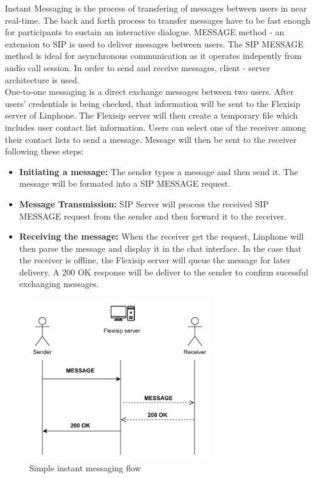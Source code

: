     Instant Messaging is the process of transfering of messages between users in near real-time.
    The back and forth process to transfer messages have to be fast enough for participants to sustain an interactive dialogue.
    MESSAGE method - an extension to SIP is used to deliver messages between users. 
    The SIP MESSAGE method is ideal for asynchronous communication as it operates indepently from audio call session.
    In order to send and receive messages, client - server architecture is used.  \\

    \noindent One-to-one messaging is a direct exchange messages between two users. 
    After users' credentials is being checked, that information will be sent to the Flexisip server of Linphone. The Flexisip server will then create a temporary file which includes user contact list information.  
    Users can select one of the receiver among their contact lists to send a message. Message will then be sent to the receiver following these steps:

    \begin{itemize}
        \item \textbf {Initiating a message:} The sender types a message and then send it. The message will be formated into a SIP MESSAGE request. 
        \item \textbf {Message Transmission:} SIP Server will process the received SIP MESSAGE request from the sender and then forward it to the receiver.
        
        \pagebreak
        \item \textbf {Receiving the message:} When the receiver get the request, Linphone will then parse the message and display it in the chat interface.
        In the case that the receiver is offline, the Flexisip server will queue the message for later delivery. A 200 OK response will be deliver to the sender to confirm sucessful exchanging messages.
    \end{itemize}

    \begin{figure}[H]
        \centering
        \includegraphics[width=0.7\textwidth]{image/Instant messaging.pdf} 
        \caption{Simple instant messaging flow}
        \label{fig:instant_messaging}
    \end{figure}


    